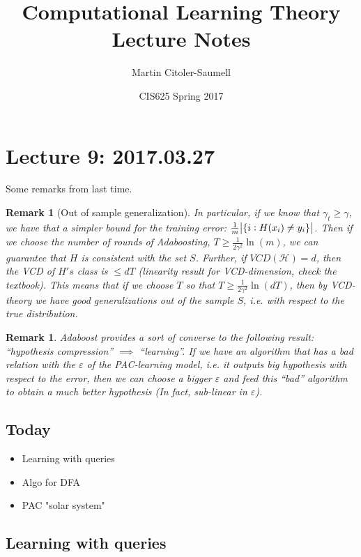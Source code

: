 \documentclass[12pt, letterpaper]{article}
\title{Computational Learning Theory Lecture Notes}
\author{Martin Citoler-Saumell}
\date{CIS625 Spring 2017}
\numberwithin{equation}{section} %
\newcommand{\mc}{\mathcal}
\newcommand{\ve}{\varepsilon}
\newtheorem{remark}[theorem]{Remark}
\theoremstyle{definition}
\theoremstyle{remark}
\begin{document}
\section{Lecture 9: 2017.03.27}
Some remarks from last time.
\begin{remark}[Out of sample generalization]
In particular, if we know that $\gamma_t \geq \gamma$, we have that a simpler bound for the training error: $\frac1m\abs{\lbrace i : H(x_i) \ne y_i \rbrace} $. Then if we choose the number of rounds of Adaboosting, $T\geq \frac1{2\gamma^2}\ln(m)$, we can guarantee that $H$ is consistent with the set $S$. Further, if $VCD(\mc H) = d$, then the VCD of $H's$ class is $\leq dT$ (linearity result for VCD-dimension, check the textbook). This means that if we choose $T$ so that $T\geq \frac1{2\gamma^2}\ln(dT)$, then by VCD-theory we have good generalizations out of the sample $S$, i.e. with respect to the true distribution.
\end{remark}

\begin{remark}
Adaboost provides a sort of converse to the following result: ``hypothesis compression'' $\implies$ ``learning''. If we have an algorithm that has a bad relation with the $\ve$ of the PAC-learning model, i.e. it outputs big hypothesis with respect to the error, then we can choose a bigger $\ve$ and feed this ``bad'' algorithm to obtain a much better hypothesis (In fact, sub-linear in $\ve$).
\end{remark}

\subsection*{Today}
\begin{itemize}
\item Learning with queries
\item Algo for DFA
\item PAC "solar system"
\end{itemize}

\subsection{Learning with queries}
\end{document}
